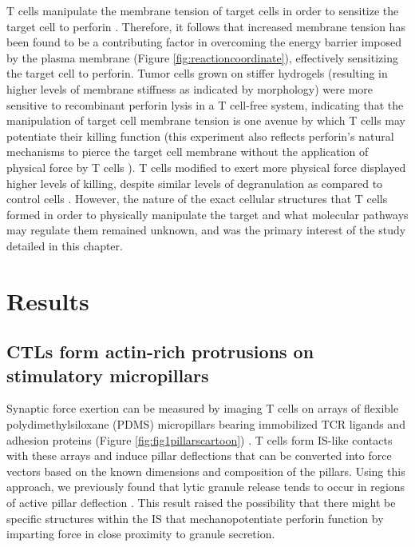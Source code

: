 T cells manipulate the membrane tension of target cells in order to sensitize the target cell to perforin \cite{Basu2016}. Therefore, it follows that increased membrane tension has been found to be a contributing factor in overcoming the energy barrier imposed by the plasma membrane (Figure \ref{fig:reactioncoordinate}), effectively sensitizing the target cell to perforin. Tumor cells grown on stiffer hydrogels (resulting in higher levels of membrane stiffness as indicated by morphology) were more sensitive to recombinant perforin lysis in a T cell-free system, indicating that the manipulation of target cell membrane tension is one avenue by which T cells may potentiate their killing function \cite{Basu2016} (this experiment also reflects perforin's natural mechanisms to pierce the target cell membrane \cite{Law2010} without the application of physical force by T cells \cite{Basu2016}).  T cells modified to exert more physical force displayed higher levels of killing, despite similar levels of degranulation as compared to control cells \cite{Basu2016}. However, the nature of the exact cellular structures that T cells formed in order to physically manipulate the target and what molecular pathways may regulate them remained unknown, and was the primary interest of the study detailed in this chapter.


\section{Results} 

\subsection{CTLs form actin-rich protrusions on stimulatory micropillars}
Synaptic force exertion can be measured by imaging T cells on arrays of flexible polydimethylsiloxane (PDMS) micropillars bearing immobilized TCR ligands and adhesion proteins (Figure \ref{fig:fig1pillarscartoon}) \cite{Bashour2014, Basu2016}. T cells form IS-like contacts with these arrays and induce pillar deflections that can be converted into force vectors based on the known dimensions and composition of the pillars. Using this approach, we previously found that lytic granule release tends to occur in regions of active pillar deflection \cite{Basu2016}. This result raised the possibility that there might be specific structures within the IS that mechanopotentiate perforin function by imparting force in close proximity to granule secretion.

